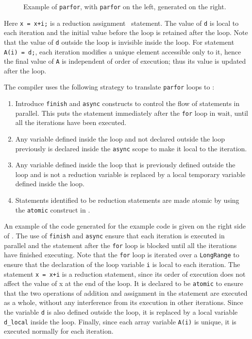 \begin{enumerate}
\begin{figure}[htbp]
\caption{Example of \texttt{parfor}, \matlab with
\texttt{parfor} on the left, generated \xten on the right.}\label{fig:parforex}
\end{figure}

Here \verb|x = x+i;| is a reduction assignment~\cite{reducassg}
statement. The value of \verb|d| is local to each iteration and the
initial value before the loop is retained after the loop. Note that the
value of \verb|d| outside the loop is invisible inside the loop. For
statement \verb|A(i) = d;|, each iteration modifies a unique element
accessible only to it, hence the final value of \verb|A| is independent
of order of execution; thus its value is updated after the loop.  
\end{enumerate}


The \mixten compiler uses the
following strategy to translate \texttt{parfor} loops to \xten:
\begin{enumerate}

\item Introduce \verb|finish| and \verb|async| constructs to control the flow
of statements in parallel. This puts the statement immediately after the
\texttt{for} loop in wait, until all the iterations have been executed.

\item Any variable defined inside the loop and not declared outside the
loop previously is declared inside the \verb|async| scope to
make it local to the iteration.

\item Any variable defined inside the loop that is previously defined
outside the loop and is not a reduction variable is replaced by
a local temporary variable defined inside the loop.

\item Statements identified to be reduction statements are made atomic
by using the \verb|atomic| construct in \xten.

\end{enumerate}

An example of the \xten code generated for the example \matlab code is
given on the right side of . The use of \verb|finish| and
\verb|async| ensure that each iteration is executed in parallel and the
statement after the \verb|for| loop is blocked until all the iterations have
finished executing. Note that the \verb|for| loop is iterated over a
\verb|LongRange| to ensure that the declaration of the loop variable \verb|i| is
local to each iteration. The statement \texttt{x = x+i} is a reduction
statement, since its order of execution does not affect the value of x at the
end of the loop. It is declared to be \verb|atomic| to ensure that the two
operations of addition and assignment in the statement are executed as a whole,
without any interference from its execution in other iterations. Since the
variable \verb|d| is also defined outside the loop, it is replaced by a local
variable \verb|d_local| inside the loop. Finally, since each array variable
\verb|A(i)| is unique, it is executed normally for each iteration.


